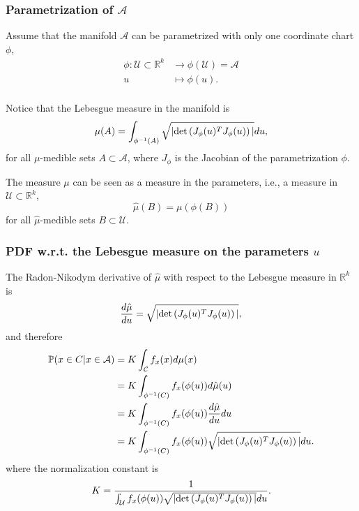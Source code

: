 \subsubsection{Parametrization of $\mathcal{A}$}

Assume that the manifold $\mathcal{A}$ can be parametrized with only one coordinate chart $\phi$,
\begin{equation}\label{eq_phi}
 \begin{aligned}
  \phi: \mathcal{U} \subset \mathbb{R}^k &\to     \phi(\mathcal{U}) = \mathcal{A} \\
              u                           &\mapsto \phi(u). \\
 \end{aligned}
\end{equation}

Notice that the Lebesgue measure in the manifold is
$$
  \mu(A) = \int_{\phi^{-1}(A)} \sqrt{|\textup{det}\left(J_{\phi}(u)^TJ_{\phi}(u)\right)|}du,
$$
for all $\mu$-medible sets $A\subset\mathcal{A}$, where $J_{\phi}$ is the Jacobian of the parametrization $\phi$.
 
The measure $\mu$ can be seen as a measure in the parameters, i.e., a measure in $\mathcal{U} \subset \mathbb{R}^k$,
$$
  \hat{\mu}(B) = \mu(\phi(B))
$$
for all $\hat{\mu}$-medible sets $B\subset\mathcal{U}$.

\subsubsection{PDF w.r.t. the Lebesgue measure on the parameters $u$}

The Radon-Nikodym derivative of $\hat{\mu}$ with respect to the Lebesgue measure in $\mathbb{R}^k$ is
\begin{equation}\label{eq_radonNikodyDerivative}
  \frac{d\hat{\mu}}{du} = \sqrt{|\textup{det}\left(J_{\phi}(u)^TJ_{\phi}(u)\right)|},
\end{equation}
and therefore
\begin{equation} \label{eq_PDFonU}
 \begin{aligned}
  \mathbb{P}(x \in C | x\in\mathcal{A}) &= K\int_{\mathcal{C}} f_x(x)d\mu(x) \\
    &= K\int_{\phi^{-1}(C)} f_x(\phi(u))d\hat{\mu}(u) \\
    &= K\int_{\phi^{-1}(C)} f_x(\phi(u))\frac{d\hat{\mu}}{du} du \\
    &= K\int_{\phi^{-1}(C)} f_x(\phi(u)) \sqrt{|\textup{det}\left(J_{\phi}(u)^TJ_{\phi}(u)\right)|} du. \\
 \end{aligned}
\end{equation}
where the normalization constant is
$$
  K = \frac{1}{
    \int_{\mathcal{U}} f_x(\phi(u)) \sqrt{|\textup{det}\left(J_{\phi}(u)^TJ_{\phi}(u)\right)|} du}.
$$

